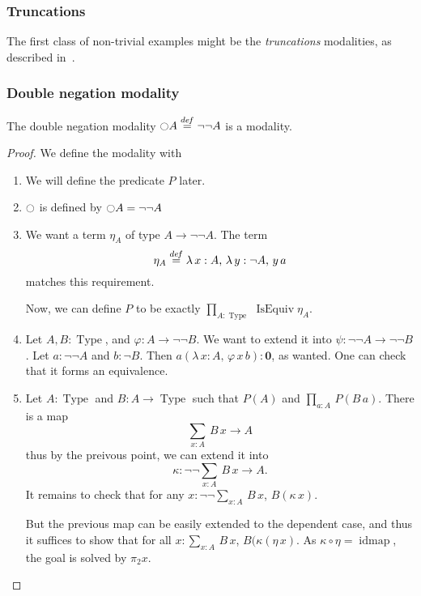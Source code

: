 \documentclass[notfinal]{jfrarticle}
\DeclareMathOperator{\Type}{Type}
\DeclareMathOperator{\IsEquiv}{IsEquiv}
\DeclareMathOperator{\idmap}{\mathrm{idmap}}
\newcommand \defeq {\overset{de\hspace{-0.2ex}f}{=}}
\newcommand{\modal}{\ensuremath{\ocircle}}
\newcommand \zero {\mathbf{0}}
\newcommand{\sumD}[3]{\sum_{#1:#2}\, #3}
\newcommand{\prodD}[3]{\prod_{#1:#2}\, #3}
\begin{document}
\subsubsection{Truncations}
\label{sssec:truncations}

The first class of non-trivial examples might be the {\em truncations}
modalities, as described in~\cite[Section 7.3]{hottbook}.

\subsubsection{Double negation modality}
\label{sssec:notnot}

\begin{prop}
  The double negation modality $\modal A \defeq \lnot\lnot A$ is a
  modality.  
\end{prop}
\begin{proof}
  We define the modality with
  \begin{enumerate}
  \item We will define the predicate $P$ later.
  \item $\modal$ is defined by $\modal A = \lnot\lnot A$
  \item We want a term $\eta_A$ of type $A \to \lnot \lnot A$.
    The term
    \[ \eta_A\defeq \lambda \, x:A,\,\lambda\, y:\lnot A,\, y\, a\] 
    matches this requirement.
    
    Now, we can define $P$ to be exactly $\prodD A \Type {\IsEquiv
      \eta_A}$.
  \item Let $A,B:\Type$, and $\varphi : A \to \lnot\lnot B$. We
    want to extend it into $\psi : \lnot\lnot A \to \lnot\lnot B$. Let
    $a:\lnot\lnot A$ and $b:\lnot B$.
    Then $a(\lambda\, x:A,\, \varphi\, x \, b) : \zero$, as
    wanted. One can check that it forms an equivalence.
  \item Let $A:\Type$ and $B:A\to\Type$ such that $P(A)$ and $\prodD a
    A {P(B\, a)}$. There is a map
    \[\sumD x A {B\, x} \to A \]
    thus by the preivous point, we can extend it into 
    \[\kappa:\lnot\lnot\sumD x A {B\, x} \to A.\]
    It remains to check that for any $x:\lnot\lnot\sumD x A {B\, x}$,
    $B(\kappa\, x)$.

    But the previous map can be easily extended to the dependent case,
    and thus it suffices to show that for all $x:\sumD x A{B\, x}$,
    $B(\kappa(\eta\, x)$. As $\kappa \circ \eta = \idmap$, the goal is
    solved by $\pi_2 x$.
  \end{enumerate}
\end{proof}
\end{document}
